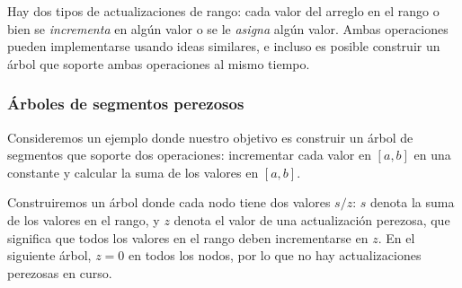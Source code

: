 Hay dos tipos de actualizaciones de rango:
cada valor del arreglo en el rango o bien se
\emph{incrementa} en algún valor
o se le \emph{asigna} algún valor.
Ambas operaciones pueden implementarse usando
ideas similares, e incluso es posible construir
un árbol que soporte ambas operaciones al mismo tiempo.

\subsubsection{Árboles de segmentos perezosos}

Consideremos un ejemplo donde nuestro objetivo es
construir un árbol de segmentos que soporte
dos operaciones: incrementar cada valor en
$[a,b]$ en una constante y calcular la suma de
los valores en $[a,b]$.

Construiremos un árbol donde cada nodo
tiene dos valores $s/z$:
$s$ denota la suma de los valores en el rango,
y $z$ denota el valor de una actualización perezosa,
que significa que todos los valores en el rango
deben incrementarse en $z$.
En el siguiente árbol, $z=0$ en todos los nodos,
por lo que no hay actualizaciones perezosas en curso.
